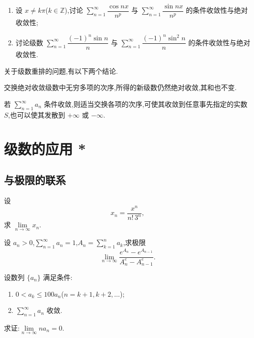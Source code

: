 \documentclass[../数学分析培优讲义.tex]{subfiles}
\begin{document}
\begin{example}
\begin{enumerate}[label=(\arabic*)]
    \item 设 $x\neq k\pi$($k\in\mathbb{Z}$),讨论 $\displaystyle\sum\limits_{n=1}^{\infty}\dfrac{\cos nx}{n^p}$ 与 $\displaystyle\sum\limits_{n=1}^{\infty}\dfrac{\sin nx}{n^p}$ 的条件收敛性与绝对收敛性;
    \item 讨论级数 $\displaystyle\sum\limits_{n=1}^{\infty}\dfrac{(-1)^n\sin n}{n}$ 与 $\displaystyle\sum\limits_{n=1}^{\infty}\dfrac{(-1)^n\sin^2n}{n}$ 的条件收敛性与绝对收敛性.
\end{enumerate}
\end{example}
\exampleblank

关于级数重排的问题,有以下两个结论.

\begin{theorem}[\markstar]
交换绝对收敛级数中无穷多项的次序,所得的新级数仍然绝对收敛,其和也不变.
\end{theorem}

\begin{theorem}
若 $\displaystyle\sum\limits_{n=1}^{\infty}a_n$ 条件收敛,则适当交换各项的次序,可使其收敛到任意事先指定的实数 $S$,也可以使其发散到 $+\infty$ 或 $-\infty$.
\end{theorem}


\newpage

\section{级数的应用 *}


\subsection{与极限的联系}

\begin{example}
设
\[
    x_n=\dfrac{x^n}{n!\,3^n},
\]
求 $\displaystyle\lim\limits_{n\to\infty}x_n$.
\end{example}
\exampleblank

\begin{example}
设 $a_n>0$,$\displaystyle\sum\limits_{n=1}^{\infty}a_n=1$,$\displaystyle A_n=\sum\limits_{k=1}^na_k$,求极限
\[
    \lim\limits_{n\to\infty}\dfrac{e^{A_n}-e^{A_{n-1}}}{A_n^e-A_{n-1}^e}.
\]
\end{example}
\exampleblank

\begin{example}
设数列 $\{a_n\}$ 满足条件:
\begin{enumerate}[label=(\arabic*)]
    \item $0<a_k\leq100a_n$($n=k+1,k+2,\ldots$);
    \item $\displaystyle\sum\limits_{n=1}^{\infty}a_n$ 收敛.
\end{enumerate}
求证:$\displaystyle\lim\limits_{n\to\infty}na_n=0$.
\end{example}
\exampleblank
\end{document}
